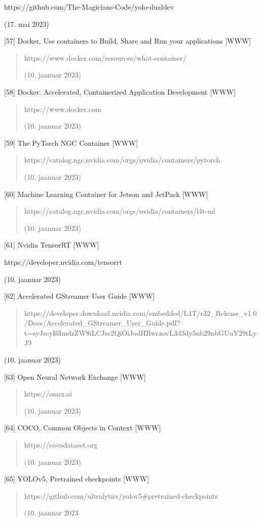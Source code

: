 \documentclass[12pt,a4paper]{report}
\begin{document}
https://github.com/The-Magicians-Code/yolo-dualdev

(17. mai 2023)

{[}57{]} Docker, Use containers to Build, Share and Run your applications {[}WWW{]}

\begin{quote}
https://www.docker.com/resources/what-container/

(10. jaanuar 2023)
\end{quote}

{[}58{]} Docker: Accelerated, Containerized Application Development {[}WWW{]}

\begin{quote}
https://www.docker.com

(10. jaanuar 2023)
\end{quote}

{[}59{]} The PyTorch NGC Container {[}WWW{]}

\begin{quote}
https://catalog.ngc.nvidia.com/orgs/nvidia/containers/pytorch

(10. jaanuar 2023)
\end{quote}

{[}60{]} Machine Learning Container for Jetson and JetPack {[}WWW{]}

\begin{quote}
https://catalog.ngc.nvidia.com/orgs/nvidia/containers/l4t-ml

(10. jaanuar 2023)
\end{quote}

{[}61{]} Nvidia TensorRT {[}WWW{]}

https://developer.nvidia.com/tensorrt

(10. jaanuar 2023)

{[}62{]} Accelerated GStreamer User Guide {[}WWW{]}

\begin{quote}
https://developer.download.nvidia.com/embedded/L4T/r32\_Release\_v1.0/Docs/Accelerated\_GStreamer\_User\_Guide.pdf?t=eyJscyI6ImdzZW8iLCJsc2QiOiJodHRwczovL3d3dy5nb29nbGUuY29tLyJ9
\end{quote}

(10. jaanuar 2023)

{[}63{]} Open Neural Network Exchange {[}WWW{]}

\begin{quote}
https://onnx.ai

(10. jaanuar 2023)
\end{quote}

{[}64{]} COCO, Common Objects in Context {[}WWW{]}

\begin{quote}
https://cocodataset.org

(10. jaanuar 2023)
\end{quote}

{[}65{]} YOLOv5, Pretrained checkpoints {[}WWW{]}

\begin{quote}
https://github.com/ultralytics/yolov5\#pretrained-checkpoints

(10. jaanuar 2023
\end{quote}
\end{document}
